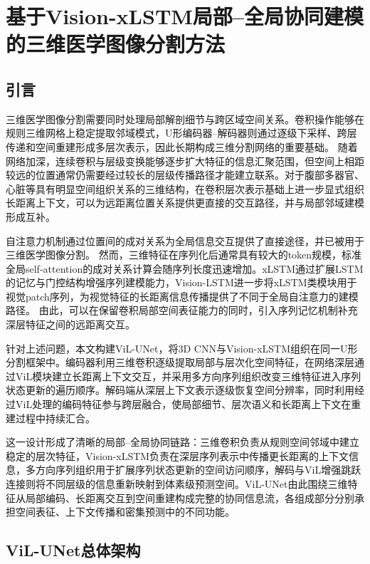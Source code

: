 \chapter{基于Vision-xLSTM局部--全局协同建模的三维医学图像分割方法}

\section{引言}

三维医学图像分割需要同时处理局部解剖细节与跨区域空间关系。卷积操作能够在规则三维网格上稳定提取邻域模式，U形编码器--解码器则通过逐级下采样、跨层传递和空间重建形成多层次表示，因此长期构成三维分割网络的重要基础。\cite{cicek2016threeDunet,ronneberger2015unet} 随着网络加深，连续卷积与层级变换能够逐步扩大特征的信息汇聚范围，但空间上相距较远的位置通常仍需要经过较长的层级传播路径才能建立联系。对于腹部多器官、心脏等具有明显空间组织关系的三维结构，在卷积层次表示基础上进一步显式组织长距离上下文，可以为远距离位置关系提供更直接的交互路径，并与局部邻域建模形成互补。

自注意力机制通过位置间的成对关系为全局信息交互提供了直接途径，并已被用于三维医学图像分割。\cite{vaswani2017attention,hatamizadeh2022unetr} 然而，三维特征在序列化后通常具有较大的token规模，标准全局self-attention的成对关系计算会随序列长度迅速增加。xLSTM通过扩展LSTM的记忆与门控结构增强序列建模能力，Vision-LSTM进一步将xLSTM类模块用于视觉patch序列，为视觉特征的长距离信息传播提供了不同于全局自注意力的建模路径。\cite{beck2024xlstm,alkin2025visionlstm} 由此，可以在保留卷积局部空间表征能力的同时，引入序列记忆机制补充深层特征之间的远距离交互。

针对上述问题，本文构建ViL-UNet，将3D CNN与Vision-xLSTM组织在同一U形分割框架中。编码器利用三维卷积逐级提取局部与层次化空间特征，在网络深层通过ViL模块建立长距离上下文交互，并采用多方向序列组织改变三维特征进入序列状态更新的遍历顺序。解码端从深层上下文表示逐级恢复空间分辨率，同时利用经过ViL处理的编码特征参与跨层融合，使局部细节、层次语义和长距离上下文在重建过程中持续汇合。

这一设计形成了清晰的局部--全局协同链路：三维卷积负责从规则空间邻域中建立稳定的层次特征，Vision-xLSTM负责在深层序列表示中传播更长距离的上下文信息，多方向序列组织用于扩展序列状态更新的空间访问顺序，解码与ViL增强跳跃连接则将不同层级的信息重新映射到体素级预测空间。ViL-UNet由此围绕三维特征从局部编码、长距离交互到空间重建构成完整的协同信息流，各组成部分分别承担空间表征、上下文传播和密集预测中的不同功能。

\section{ViL-UNet总体架构}

